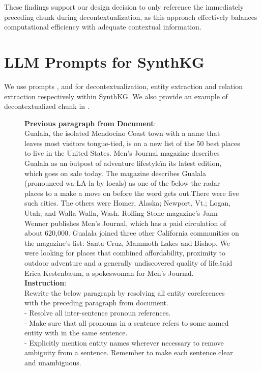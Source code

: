 \documentclass{article} %
\begin{document}
These findings support our design decision to only reference the immediately preceding chunk during decontextualization, as this approach effectively balances computational efficiency with adequate contextual information.


\section{LLM Prompts for SynthKG} \label{sec:kg-synthesis-prompts}
We use prompts ,  and  for decontextualization, entity extraction and relation extraction respectively within SynthKG. We also provide an example of decontextualized chunk in .


\begin{figure}[!ht]
\tiny
\begin{mdframed}
\textbf{Previous paragraph from Document}:\\
Gualala, the isolated Mendocino Coast town with a name that leaves most visitors tongue-tied, is on a new list of the 50 best places to live in the United States. Men's Journal magazine describes Gualala as an \"outpost of adventure lifestyle\" in its latest edition, which goes on sale today. The magazine describes Gualala (pronounced wa-LA-la by locals) as one of the \"below-the-radar places to a make a move on before the word gets out.\" There were five such cities. The others were Homer, Alaska; Newport, Vt.; Logan, Utah; and Walla Walla, Wash. Rolling Stone magazine's Jann Wenner publishes Men's Journal, which has a paid circulation of about 620,000. Gualala joined three other California communities on the magazine's list: Santa Cruz, Mammoth Lakes and Bishop. \"We were looking for places that combined affordability, proximity to outdoor adventure and a generally undiscovered quality of life,\" said Erica Kestenbaum, a spokeswoman for Men's Journal.\\
\textbf{Instruction}: \\
Rewrite the below paragraph by resolving all entity coreferences with the preceding paragraph from document. \\
- Resolve all inter-sentence pronoun references. \\
- Make sure that all pronouns in a sentence refers to some named entity with in the same sentence. \\
- Explicitly mention entity names wherever necessary to remove ambiguity from a sentence. Remember to make each sentence clear and unambiguous. \\

\end{mdframed}
\end{figure}
\end{document}
